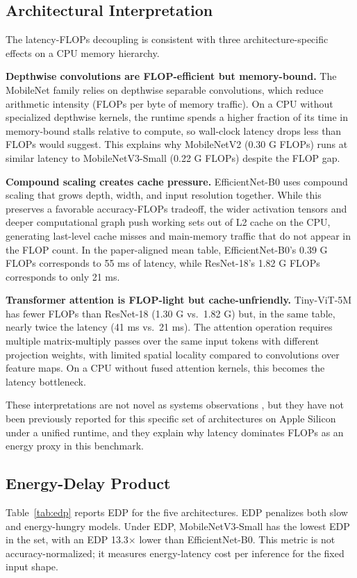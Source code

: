 \documentclass[conference]{IEEEtran}
\begin{document}
\subsection{Architectural Interpretation}
The latency-FLOPs decoupling is consistent with three architecture-specific
effects on a CPU memory hierarchy.

\textbf{Depthwise convolutions are FLOP-efficient but memory-bound.} The
MobileNet family relies on depthwise separable convolutions, which reduce
arithmetic intensity (FLOPs per byte of memory traffic). On a CPU without
specialized depthwise kernels, the runtime spends a higher fraction of its
time in memory-bound stalls relative to compute, so wall-clock latency drops
less than FLOPs would suggest. This explains why MobileNetV2 (0.30 G FLOPs)
runs at similar latency to MobileNetV3-Small (0.22 G FLOPs) despite the FLOP
gap.

\textbf{Compound scaling creates cache pressure.} EfficientNet-B0 uses
compound scaling that grows depth, width, and input resolution together. While
this preserves a favorable accuracy-FLOPs tradeoff, the wider activation
tensors and deeper computational graph push working sets out of L2 cache on
the CPU, generating last-level cache misses and main-memory traffic that do
not appear in the FLOP count. In the paper-aligned mean table,
EfficientNet-B0's 0.39 G FLOPs corresponds to
55 ms of latency, while ResNet-18's 1.82 G FLOPs corresponds to only 21 ms.

\textbf{Transformer attention is FLOP-light but cache-unfriendly.} Tiny-ViT-5M
has fewer FLOPs than ResNet-18 (1.30 G vs.\ 1.82 G) but, in the same table,
nearly twice the
latency (41 ms vs.\ 21 ms). The attention operation requires multiple
matrix-multiply passes over the same input tokens with different projection
weights, with limited spatial locality compared to convolutions over feature
maps. On a CPU without fused attention kernels, this becomes the latency
bottleneck.

These interpretations are not novel as systems observations
\cite{eyeriss2017,hardwareaware2019}, but they have not been previously
reported for this specific set of architectures on Apple Silicon under a
unified runtime, and they explain why latency dominates FLOPs as an energy
proxy in this benchmark.

\subsection{Energy-Delay Product}
Table~\ref{tab:edp} reports EDP for the five architectures. EDP penalizes
both slow and energy-hungry models. Under EDP, MobileNetV3-Small has the
lowest EDP in the set, with an EDP 13.3$\times$ lower than
EfficientNet-B0. This metric is not accuracy-normalized; it measures
energy-latency cost per inference for the fixed input shape.
\end{document}
